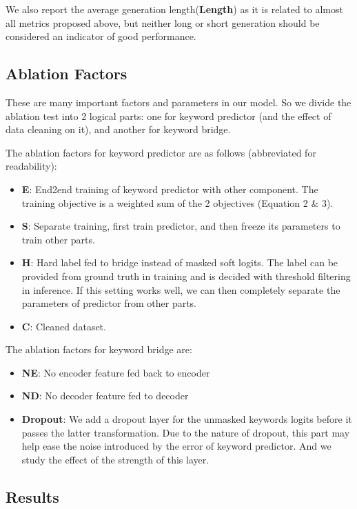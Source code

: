 \documentclass[letterpaper]{article} %
\begin{document}
We also report the average generation length(\textbf{Length}) as it is related to almost all metrics proposed above, but neither long or short generation should be considered an indicator of good performance.

\subsection{Ablation Factors}

These are many important factors and parameters in our model. So we divide the ablation test into 2 logical parts: one for keyword predictor (and the effect of data cleaning on it), and another for keyword bridge. 

The ablation factors for keyword predictor are as follows (abbreviated for readability):
\begin{itemize}
  \item \textbf{E}: End2end training of keyword predictor with other component. The training objective is a weighted sum of the 2 objectives (Equation 2 \& 3).
  \item \textbf{S}: Separate training, first train predictor, and then freeze its parameters to train other parts. 
  \item \textbf{H}: Hard label fed to bridge instead of masked soft logits. The label can be provided from ground truth in training and is decided with threshold filtering in inference. If this setting works well, we can then completely separate the parameters of predictor from other parts.
  \item \textbf{C}: Cleaned dataset.
\end{itemize}


The ablation factors for keyword bridge are:
\begin{itemize}
  \item \textbf{NE}: No encoder feature fed back to encoder
  \item \textbf{ND}: No decoder feature fed to decoder
  \item \textbf{Dropout}: We add a dropout layer for the unmasked keywords logits before it passes the latter transformation. Due to the nature of dropout, this part may help ease the noise introduced by the error of keyword predictor. And we study the effect of the strength of this layer.
\end{itemize}

\subsection{Results}
\end{document}
